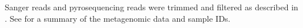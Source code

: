 Sanger reads and pyrosequencing reads were trimmed and filtered as described in \citet{Lauro2011}.
See  for a summary of the metagenomic data and sample IDs.


 

